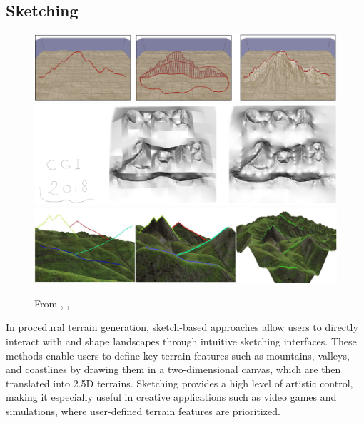 
\subsection{Sketching}

\begin{figure}[ht]
	\centering
	\includegraphics[width = 0.45 \linewidth]{sketchingGain2009.png}
    \includegraphics[width = 0.45 \linewidth]{sketchingTalgorn2018.png}
    \includegraphics[width = 0.45 \linewidth]{sketchingTasse2014.png}
    \caption{From \cite{Gain2009}, \cite{Talgorn2018}, \cite{Tasse2015}}
    \label{fig:coral-island_sketching-examples}
\end{figure}

In procedural terrain generation, sketch-based approaches allow users to directly interact with and shape landscapes through intuitive sketching interfaces. These methods enable users to define key terrain features such as mountains, valleys, and coastlines by drawing them in a two-dimensional canvas, which are then translated into 2.5D terrains. Sketching provides a high level of artistic control, making it especially useful in creative applications such as video games and simulations, where user-defined terrain features are prioritized.

